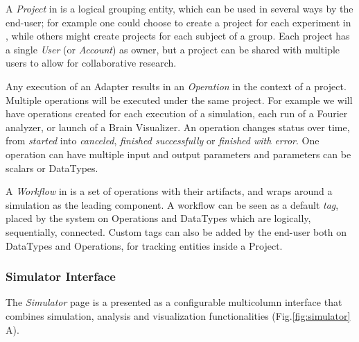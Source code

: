 		A \emph{Project} in \TVB is a logical grouping entity, which  can be
		used in several ways by the end-user;  for example one could choose to
		create a project for each experiment in \TVB, while others might
		create projects for each subject of a group. Each project has a single
		\emph{User} (or \emph{Account}) as owner, but a project can be shared
		with multiple users to allow for collaborative research.

		Any execution of an Adapter results in an \emph{Operation} in the
		context of a project. Multiple operations will be executed under the
		same project. For example we will have operations created for each
		execution of a simulation, each run of a Fourier analyzer, or launch
		of a Brain Visualizer. An operation changes status over time, from
		\emph{started} into \emph{canceled}, \emph{finished successfully} or
		\emph{finished with error}. One operation can have multiple input and
		output parameters and parameters can be scalars or DataTypes.

		A \emph{Workflow} in \TVB is a set of operations with their artifacts,
		and wraps around a simulation as the leading component. A workflow can be
		seen as a default \emph{tag}, placed by the system on Operations and
		DataTypes  which are logically, sequentially, connected.
		Custom tags can also be added by the end-user both on DataTypes
		and Operations, for tracking entities inside a Project.

		\subsubsection{Simulator Interface}

		The \emph{Simulator} page is a presented as a configurable multicolumn interface that combines \TVB simulation, analysis and visualization functionalities (Fig.\ref{fig:simulator} A).

